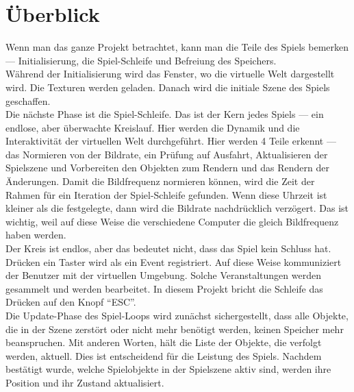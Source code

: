 \documentclass[
  10pt,
  a4paper,
  oneside,
  headers,
  headinclude,
  footinclude,
  BCOR5mm,
]{article}
\begin{document}
\section{Überblick}
Wenn man das ganze Projekt betrachtet, kann man die Teile des Spiels bemerken --- Initialisierung, die Spiel-Schleife und Befreiung des Speichers.\\
Während der Initialisierung wird das Fenster, wo die virtuelle Welt dargestellt wird. Die Texturen werden geladen. Danach wird die initiale Szene des Spiels geschaffen.\\
Die nächste Phase ist die Spiel-Schleife. Das ist der Kern jedes Spiels --- ein endlose, aber überwachte Kreislauf. Hier werden die Dynamik und die Interaktivität der virtuellen Welt durchgeführt. Hier werden 4 Teile erkennt --- das Normieren von der Bildrate, ein Prüfung auf Ausfahrt, Aktualisieren der Spielszene und Vorbereiten den Objekten zum Rendern und
das Rendern der Änderungen. Damit die Bildfrequenz normieren können, wird die Zeit der Rahmen für ein Iteration der Spiel-Schleife gefunden. Wenn diese Uhrzeit ist kleiner als die festgelegte, dann wird die Bildrate nachdrücklich verzögert. Das ist wichtig, weil auf diese Weise die verschiedene Computer die gleich Bildfrequenz haben werden.\\
Der Kreis ist endlos, aber das bedeutet nicht, dass das Spiel kein Schluss hat. Drücken ein Taster wird als ein Event registriert. Auf diese Weise kommuniziert der Benutzer mit der virtuellen Umgebung. Solche Veranstaltungen werden gesammelt und werden bearbeitet. In diesem Projekt bricht die Schleife das Drücken auf den Knopf ``ESC''.\\
Die Update-Phase des Spiel-Loops wird zunächst sichergestellt, dass alle Objekte, die in der Szene zerstört oder nicht mehr benötigt werden, keinen Speicher mehr beanspruchen. Mit anderen Worten, hält die Liste der Objekte, die verfolgt werden, aktuell. Dies ist entscheidend für die Leistung des Spiels. Nachdem bestätigt wurde, welche Spielobjekte in der Spielszene aktiv sind, werden ihre Position und ihr Zustand aktualisiert.\\
\end{document}
